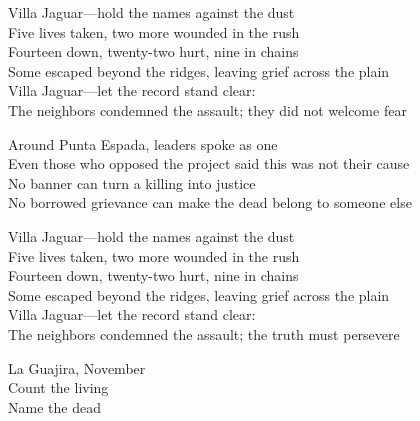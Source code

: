 \begin{lyrics}
Villa Jaguar—hold the names against the dust\\
Five lives taken, two more wounded in the rush\\
Fourteen down, twenty-two hurt, nine in chains\\
Some escaped beyond the ridges, leaving grief across the plain\\
Villa Jaguar—let the record stand clear:\\
The neighbors condemned the assault; they did not welcome fear

Around Punta Espada, leaders spoke as one\\
Even those who opposed the project said this was not their cause\\
No banner can turn a killing into justice\\
No borrowed grievance can make the dead belong to someone else

Villa Jaguar—hold the names against the dust\\
Five lives taken, two more wounded in the rush\\
Fourteen down, twenty-two hurt, nine in chains\\
Some escaped beyond the ridges, leaving grief across the plain\\
Villa Jaguar—let the record stand clear:\\
The neighbors condemned the assault; the truth must persevere

La Guajira, November\\
Count the living\\
Name the dead
\end{lyrics}

